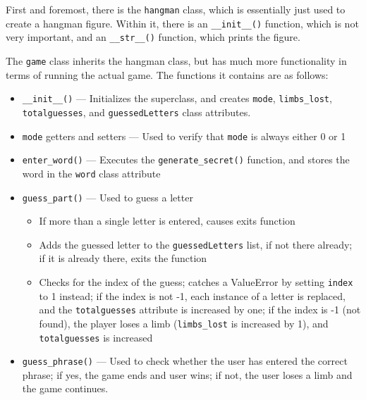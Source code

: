 \documentclass[
	letterpaper, %
	10pt, %
]{CSUniSchoolLabReport}
\begin{document}
First and foremost, there is the \texttt{hangman} class, which is essentially just used to create a hangman figure. Within it, there is an \texttt{\_\_init\_\_()} function, which is not very important, and an \texttt{\_\_str\_\_()} function, which prints the figure.

The \texttt{game} class inherits the hangman class, but has much more functionality in terms of running the actual game. The functions it contains are as follows:

\begin{itemize}

  \item \texttt{\_\_init\_\_()} — Initializes the superclass, and creates \texttt{mode}, \texttt{limbs\_lost}, \texttt{totalguesses}, and \texttt{guessedLetters} class attributes.

  \item \texttt{mode} getters and setters — Used to verify that \texttt{mode} is always either 0 or 1

  \item \texttt{enter\_word()} — Executes the \texttt{generate\_secret()} function, and stores the word in the \texttt{word} class attribute

  \item \texttt{guess\_part()} — Used to guess a letter

    \begin{itemize}

      \item If more than a single letter is entered, causes exits function

      \item Adds the guessed letter to the \texttt{guessedLetters} list, if not there already; if it is already there, exits the function

      \item Checks for the index of the guess; catches a ValueError by setting \texttt{index} to 1 instead; if the index is not -1, each instance of a letter is replaced, and the \texttt{totalguesses} attribute is increased by one; if the index is -1 (not found), the player loses a limb (\texttt{limbs\_lost} is increased by 1), and \texttt{totalguesses} is increased

    \end{itemize}

  \item \texttt{guess\_phrase()} — Used to check whether the user has entered the correct phrase; if yes, the game ends and user wins; if not, the user loses a limb and the game continues.


\end{itemize}
\end{document}
